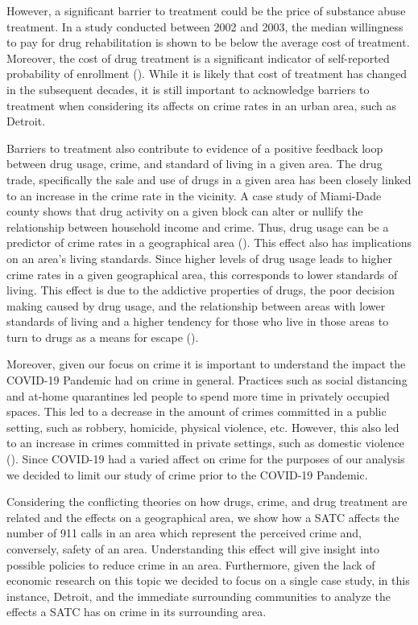 \documentclass[12pt]{article}
\begin{document}
However, a significant barrier to treatment could be the price of substance abuse treatment. In a study conducted between 2002 and 2003, the median willingness to pay for drug rehabilitation is shown to be below the average cost of treatment. Moreover, the cost of drug treatment is a significant indicator of self-reported probability of enrollment (\cite{cost_of_drug_treatment}). While it is likely that cost of treatment has changed in the subsequent decades, it is still important to acknowledge barriers to treatment when considering its affects on crime rates in an urban area, such as Detroit. 

Barriers to  treatment also contribute to evidence of a positive feedback loop between drug usage, crime, and standard of living in a given area. The drug trade, specifically the sale and use of drugs in a given area has been closely linked to an increase in the crime rate in the vicinity. A case study of Miami-Dade county shows that drug activity on a given block can alter or nullify the relationship between household income and crime. Thus, drug usage can be a predictor of crime rates in a geographical area (\cite{drugs_crime_space_time}). This effect also has implications on an area's living standards. Since higher levels of drug usage leads to higher crime rates in a given geographical area, this corresponds to lower standards of living. This effect is due to the addictive properties of drugs, the poor decision making caused by drug usage, and the relationship between areas with lower standards of living and a higher tendency for those who live in those areas to turn to drugs as a means for escape (\cite{drugs_and_crime}).

Moreover, given our focus on crime it is important to understand the impact the COVID-19 Pandemic had on crime in general. Practices such as social distancing and at-home quarantines led people to spend more time in privately occupied spaces. This led to a decrease in the amount of crimes committed in a public setting, such as robbery, homicide, physical violence, etc. However, this also led to an increase in crimes committed in private settings, such as domestic violence (\cite{covid_and_crime}). Since COVID-19 had a varied affect on crime for the purposes of our analysis we decided to limit our study of crime prior to the COVID-19 Pandemic.

Considering the conflicting theories on how drugs, crime, and drug treatment are related and the effects on a geographical area, we show how a SATC affects the number of 911 calls in an area which represent the perceived crime and, conversely, safety of an area. Understanding this effect will give insight into possible policies to reduce crime in an area. Furthermore, given the lack of economic research on this topic we decided to focus on a single case study, in this instance, Detroit, and the immediate surrounding communities to analyze the effects a SATC has on crime in its surrounding area. 
\end{document}
